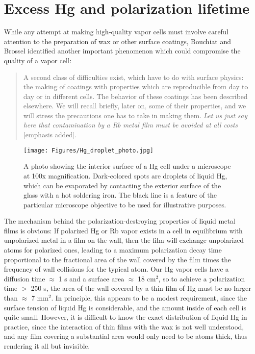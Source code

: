 \documentclass [10pt, twoside] {uwthesis}[2012/04/02]
\begin{document}
\section{Excess Hg and polarization lifetime}
While any attempt at making high-quality vapor cells must involve careful attention to the preparation of wax or other surface coatings, Bouchiat and Brossel \cite{1966_Bouchiat_Brossel_Rb_relaxation} identified another important phenomenon which could compromise the quality of a vapor cell:

\begin{quote} A second class of difficulties exist, which have to do with surface physics: the making of coatings with properties which are reproducible from day to day or in different cells. The behavior of these coatings has been described elsewhere. We will recall briefly, later on, some of their properties, and we will stress the precautions one has to take in making them. \textit{Let us just say here that contamination by a Rb metal film must be avoided at all costs} [emphasis added].\end{quote} 
\begin{figure}
\begin{center}
\texttt{[image: Figures/Hg\_droplet\_photo.jpg]}
\end{center}
\caption[Interior surface of a cell endcap with $^{199}$Hg droplets]%
{\narrower A photo showing the interior surface of a Hg cell under a microscope at 100x magnification. Dark-colored spots are droplets of liquid Hg, which can be evaporated by contacting the exterior surface of the glass with a hot soldering iron. The black line is a feature of the particular microscope objective to be used for illustrative purposes.}
\label{HgDroplet}
\end{figure}
The mechanism behind the polarization-destroying properties of liquid metal films is obvious: If polarized Hg or Rb vapor exists in a cell in equilibrium with unpolarized metal in a film on the wall, then the film will exchange unpolarized atoms for polarized ones, leading to a maximum polarization decay time proportional to the fractional area of the wall covered by the film times the frequency of wall collisions for the typical atom. Our Hg vapor cells have a diffusion time $\approx$ 1 s and a surface area $\approx$ 18 cm$^2$, so to achieve a polarization time $>$ 250 s, the area of the wall covered by a thin film of Hg must be no larger than $\approx$ 7 mm$^2$. In principle, this appears to be a modest requirement, since the surface tension of liquid Hg is considerable, and the amount inside of each cell is quite small. However, it is difficult to know the exact distribution of liquid Hg in practice, since the interaction of thin films with the wax is not well understood, and any film covering a substantial area would only need to be atoms thick, thus rendering it all but invisible.
\end{document}
